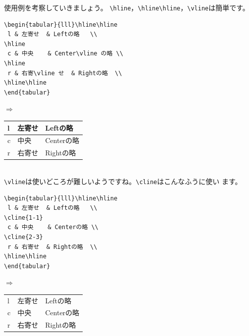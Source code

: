 使用例を考察していきましょう。
\verb+\hline+，\verb+\hline\hline+，\verb+\vline+は簡単です。\\
\begin{minipage}[c]{.50\textwidth}
\begin{screen}
\small
\begin{verbatim}
\begin{tabular}{lll}\hline\hline
 l & 左寄せ  & Leftの略   \\
\hline
 c & 中央    & Center\vline の略 \\
\hline
 r & 右寄\vline せ  & Rightの略  \\
\hline\hline
\end{tabular}
\end{verbatim}
\end{screen}
\end{minipage}%
$\Rightarrow$
\begin{minipage}{.45\textwidth}
\begin{shadebox}
\begin{tabular}{lll}\hline\hline
 l & 左寄せ  & Leftの略   \\
\hline
 c & 中央    & Center\vline の略 \\
\hline
 r & 右寄\vline せ  & Rightの略  \\
\hline\hline
\end{tabular}
\end{shadebox}
\end{minipage}
\vspace*{1mm}\\
\verb+\vline+は使いどころが難しいようですね。\verb+\cline+はこんなふうに使い
ます。\\
\begin{minipage}[c]{.50\textwidth}
\begin{screen}
\small
\begin{verbatim}
\begin{tabular}{lll}\hline\hline
 l & 左寄せ  & Leftの略   \\
\cline{1-1}
 c & 中央    & Centerの略 \\
\cline{2-3}
 r & 右寄せ  & Rightの略  \\
\hline\hline
\end{tabular}
\end{verbatim}
\end{screen}
\end{minipage}%
$\Rightarrow$
\begin{minipage}{.45\textwidth}
\begin{shadebox}
\begin{tabular}{lll}\hline\hline
 l & 左寄せ  & Leftの略   \\
\cline{1-1}
 c & 中央    & Centerの略 \\
\cline{2-3}
 r & 右寄せ  & Rightの略  \\
\hline\hline
\end{tabular}
\end{shadebox}
\end{minipage}
